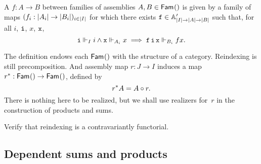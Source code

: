 \begin{definition}
  A  $f : A \to B$ between families of assemblies $A, B \in \Fam{I}$ is given by a family of maps $(f_i : \S{A_i} \to \S{B_i})_{i \in \S{I}}$
  for which there exists $\R{f} \in \subAtyp{\S{I} \to \S{A} \to \S{B}}$ such that,
  for all $i$, $\R{i}$, $x$, $\R{x}$,
  \begin{equation*}
    \R{i} \rz[I] i \land \R{x} \rz[A_i] x \implies \R{f}\,\R{i}\,\R{x} \rz[B_i] f x.
  \end{equation*}
\end{definition}

The definition endows each $\Fam{I}$ with the structure of a category.
%
Reindexing is still precomposition. And assembly map $r : J \to I$ induces a map $\invim{r} : \Fam{I} \to \Fam{J}$, defined by
%
\begin{equation*}
  \invim{r} A = A \circ r.
\end{equation*}
%
There is nothing here to be realized, but we shall use realizers for~$r$ in the construction of products and sums.

\begin{exercise}
  Verify that reindexing is a contravariantly functorial.
\end{exercise}


\subsection{Dependent sums and products}
\label{sec:depend-sums-prod}



